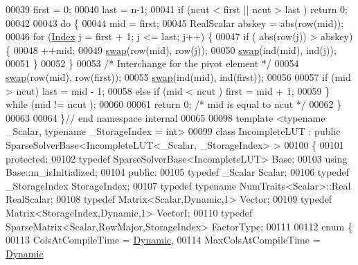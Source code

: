 \begin{DoxyCode}
00039   first = 0; 
00040   last = n-1; 
00041   \textcolor{keywordflow}{if} (ncut < first || ncut > last ) \textcolor{keywordflow}{return} 0;
00042   
00043   \textcolor{keywordflow}{do} \{
00044     mid = first; 
00045     RealScalar abskey = abs(row(mid)); 
00046     \textcolor{keywordflow}{for} (\hyperlink{namespace_eigen_a62e77e0933482dafde8fe197d9a2cfde}{Index} j = first + 1; j <= last; j++) \{
00047       \textcolor{keywordflow}{if} ( abs(row(j)) > abskey) \{
00048         ++mid;
00049         \hyperlink{endian_8c_a3ca5ecd34b04d6a243c054ac3a57f68d}{swap}(row(mid), row(j));
00050         \hyperlink{endian_8c_a3ca5ecd34b04d6a243c054ac3a57f68d}{swap}(ind(mid), ind(j));
00051       \}
00052     \}
00053     \textcolor{comment}{/* Interchange for the pivot element */}
00054     \hyperlink{endian_8c_a3ca5ecd34b04d6a243c054ac3a57f68d}{swap}(row(mid), row(first));
00055     \hyperlink{endian_8c_a3ca5ecd34b04d6a243c054ac3a57f68d}{swap}(ind(mid), ind(first));
00056     
00057     \textcolor{keywordflow}{if} (mid > ncut) last = mid - 1;
00058     \textcolor{keywordflow}{else} \textcolor{keywordflow}{if} (mid < ncut ) first = mid + 1; 
00059   \} \textcolor{keywordflow}{while} (mid != ncut );
00060   
00061   \textcolor{keywordflow}{return} 0; \textcolor{comment}{/* mid is equal to ncut */} 
00062 \}
00063 
00064 \}\textcolor{comment}{// end namespace internal}
00065 
00098 \textcolor{keyword}{template} <\textcolor{keyword}{typename} \_Scalar, \textcolor{keyword}{typename} \_StorageIndex = \textcolor{keywordtype}{int}>
00099 \textcolor{keyword}{class }IncompleteLUT : \textcolor{keyword}{public} SparseSolverBase<IncompleteLUT<\_Scalar, \_StorageIndex> >
00100 \{
00101   \textcolor{keyword}{protected}:
00102     \textcolor{keyword}{typedef} SparseSolverBase<IncompleteLUT> Base;
00103     \textcolor{keyword}{using} Base::m\_isInitialized;
00104   \textcolor{keyword}{public}:
00105     \textcolor{keyword}{typedef} \_Scalar Scalar;
00106     \textcolor{keyword}{typedef} \_StorageIndex StorageIndex;
00107     \textcolor{keyword}{typedef} \textcolor{keyword}{typename} NumTraits<Scalar>::Real RealScalar;
00108     \textcolor{keyword}{typedef} Matrix<Scalar,Dynamic,1> Vector;
00109     \textcolor{keyword}{typedef} Matrix<StorageIndex,Dynamic,1> VectorI;
00110     \textcolor{keyword}{typedef} SparseMatrix<Scalar,RowMajor,StorageIndex> FactorType;
00111 
00112     \textcolor{keyword}{enum} \{
00113       ColsAtCompileTime = \hyperlink{namespace_eigen_ad81fa7195215a0ce30017dfac309f0b2}{Dynamic},
00114       MaxColsAtCompileTime = \hyperlink{namespace_eigen_ad81fa7195215a0ce30017dfac309f0b2}{Dynamic}

\end{DoxyCode}
